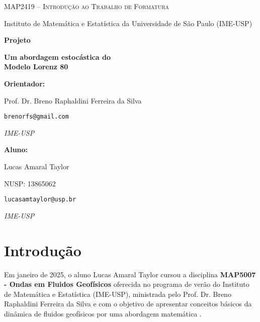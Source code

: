 \documentclass[12pt]{article}
\begin{document}
\begin{titlepage}
    \centering
    {\Large\scshape MAP2419 -- Introdução ao Trabalho de Formatura \par}
    \vspace{0.3cm}
    {\large Instituto de Matemática e Estatística da Universidade de São Paulo (IME-USP)\par}
    
    \vspace{3cm}
    
    {\LARGE\bfseries Projeto\par}
    \vspace{1cm}
    {\LARGE\bfseries Um abordagem estocástica do\\ Modelo Lorenz 80\par}
    
    \vfill
    
    \begin{minipage}[t]{0.45\textwidth}
        \raggedright
        \textbf{Orientador:} \par
        Prof. Dr. Breno Raphaldini Ferreira da Silva  \par
        \texttt{brenorfs@gmail.com} \par
        \textit{IME-USP} \par\medskip
    \end{minipage}
    \hfill
    \begin{minipage}[t]{0.45\textwidth}
        \raggedright
        \textbf{Aluno:} \par
        Lucas Amaral Taylor \par
        NUSP: 13865062 \par
        \texttt{lucasamtaylor@usp.br} \par
        \textit{IME-USP}
    \end{minipage}
    \vspace{2cm}
\end{titlepage}

\section*{Introdução}


Em janeiro de 2025, o aluno Lucas Amaral Taylor cursou a disciplina \textbf{MAP5007 - Ondas em Fluidos Geofísicos} oferecida no programa de verão do Instituto de Matemática e Estatística (IME-USP), ministrada pelo Prof. Dr. Breno Raphaldini Ferreira da Silva e com o objetivo de apresentar conceitos básicos da dinâmica de fluidos geofísicos por uma abordagem matemática \citep{uspJanus}. 
\end{document}
